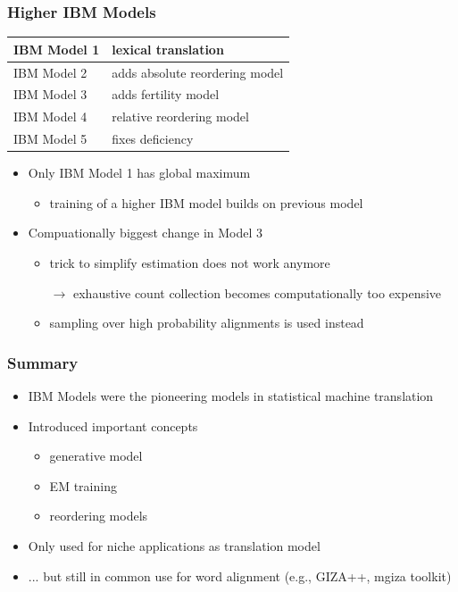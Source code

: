 \begin{frame}
\frametitle{Higher IBM Models\koehnref}
\vspace{10mm}
\begin{center}
\begin{tabular}{|l|l|} \hline
IBM Model 1 & lexical translation \\ \hline
IBM Model 2 & adds absolute reordering model \\ \hline
IBM Model 3 & adds fertility model \\ \hline
IBM Model 4 & relative reordering model \\ \hline
IBM Model 5 & fixes deficiency \\ \hline
\end{tabular}
\end{center}
\begin{itemize}
\item Only IBM Model 1 has global maximum 
\begin{itemize}
\item training of a higher IBM model builds on previous model
\end{itemize}
\item Compuationally biggest change in Model 3 
\begin{itemize} 
\item trick to simplify estimation does not work anymore
\item[$\rightarrow$] exhaustive count collection becomes computationally too expensive
\item sampling over high probability alignments is used instead
\end{itemize}
\end{itemize}

\end{frame}


\begin{frame}
\frametitle{Summary\koehnref}
\vspace{10mm}
\begin{itemize}
\item IBM Models were the pioneering models in statistical machine translation
\item Introduced important concepts
\begin{itemize}
\item generative model
\item EM training
\item reordering models
\end{itemize}
\vspace{5mm}
\item Only used for niche applications as translation model
\item ... but still in common use for word alignment (e.g., GIZA++, mgiza toolkit)
\end{itemize}

\end{frame}


